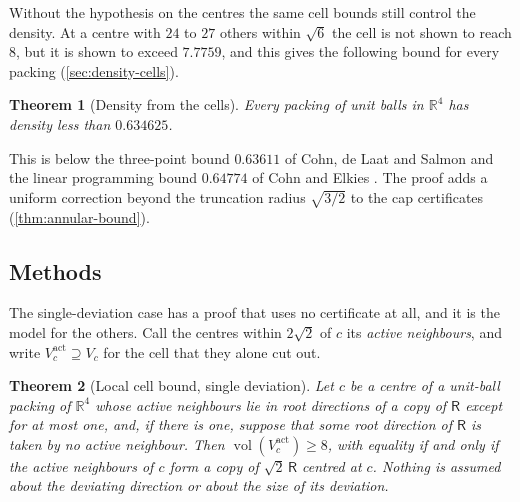 \documentclass[11pt,reqno]{amsart}
\renewcommand{\_}{\origunderscore\allowbreak}
\numberwithin{equation}{section}
\theoremstyle{plain}
\newtheorem{thm}{Theorem}[section]
\theoremstyle{definition}
\theoremstyle{remark}
\newcommand{\Rt}{\mathsf{R}}                 %
\DeclareMathOperator{\vol}{vol}
\begin{document}
Without the hypothesis on the centres the same cell bounds still control
the density. At a centre with $24$ to $27$ others within $\sqrt6$ the cell
is not shown to reach $8$, but it is shown to exceed $7.7759$, and this gives
the following bound for every packing (\cref{sec:density-cells}).

\begin{thm}[Density from the cells]\label{thm:intro-density}
Every packing of unit balls in $\mathbb{R}^4$ has density less than
$0.634625$.
\end{thm}

This is below the three-point bound $0.63611$ of Cohn, de Laat and Salmon
\cite{CdLS22} and the linear programming bound $0.64774$ of Cohn and Elkies
\cite{CE03}. The proof adds a uniform correction beyond the truncation
radius $\sqrt{3/2}$ to the cap certificates (\cref{thm:annular-bound}).

\subsection{Methods}\label{sec:methods-intro}

The single-deviation case has a proof that uses no certificate at all,
and it is the model for the others. Call the centres within $2\sqrt2$ of
$c$ its \emph{active neighbours}, and write
$V_c^{\mathrm{act}}\supseteq V_c$ for the cell that they alone cut out.

\begin{thm}[Local cell bound, single deviation]\label{thm:local-uncond}
Let $c$ be a centre of a unit-ball packing of $\mathbb{R}^4$ whose active
neighbours lie in root directions of a copy of $\Rt$ except for at most
one, and, if there is one, suppose that some root direction of $\Rt$ is
taken by no active neighbour. Then $\vol(V_c^{\mathrm{act}})\ge8$, with
equality if and only if the active neighbours of $c$ form a copy of
$\sqrt2\,\Rt$ centred at $c$. Nothing is assumed about the deviating
direction or about the size of its deviation.
\end{thm}
\end{document}
